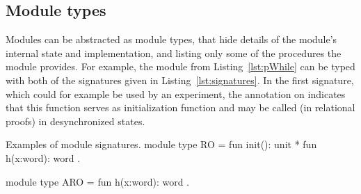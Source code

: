 %
%
%
%

\subsection{Module types}
Modules can be abstracted as module types, that hide details of the module's
internal state and implementation, and listing only some of the procedures the
module provides. For example, the  module from
Listing~\ref{lst:pWhile} can be typed with both of the signatures given in
Listing~\ref{lst:signatures}. In the first signature, which could for example
be used by an experiment, the \rawec{\{*\}}  annotation on 
indicates that this function serves as initialization function and may be called
(in relational proofs) in desynchronized states.

\begin{easycrypt}[label={lst:signatures}]{Examples of module signatures.}
module type RO = {
  fun init(): unit {*}
  fun h(x:word): word
}.

module type ARO = {
  fun h(x:word): word
}.
\end{easycrypt}

